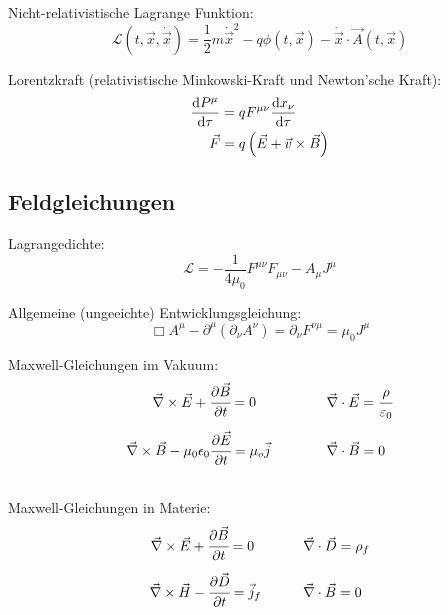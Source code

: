 \documentclass[11pt]{article}
\numberwithin{equation}{section}
\begin{document}
			\noindent
			Nicht-relativistische Lagrange Funktion:
			\begin{equation}
				\mathcal{L}(t,\vec{x},\dot{\vec{x}}) = \frac{1}{2}m\dot{\vec{x}}^2 - q\phi(t,\vec{x}) - \dot{\vec{x}}\cdot\vec{A}(t,\vec{x})
			\end{equation}

			\noindent
			Lorentzkraft (relativistische Minkowski-Kraft und Newton'sche Kraft):
			\begin{equation}
				\begin{aligned}
					\frac{\mathrm{d} P^\mu}{\mathrm{d} \tau} &= q F^{\mu\nu}\frac{\mathrm{d} x_\nu}{\mathrm{d} \tau} \\
					\vec{F} &= q\left(\vec{E}+\vec{v}\times\vec{B}\right) \\
				\end{aligned}
			\end{equation}

		\subsection{Feldgleichungen}
			\noindent
			Lagrangedichte:
			\begin{equation}
				\mathcal{L} = -\frac{1}{4\mu_0}F^{\mu\nu} F_{\mu\nu} - A_\mu J^\mu
			\end{equation}

			\noindent
			Allgemeine (ungeeichte) Entwicklungsgleichung:
			\begin{equation}
				\Box A^\mu-\partial^\mu\left(\partial_\nu A^\nu\right) = \partial_\nu F^{\nu\mu} =  \mu_0 J^\mu
			\end{equation}

			\noindent
			Maxwell-Gleichungen im Vakuum:
			\begin{equation}
			\begin{array}{rl}
				\vec{\nabla}\times \vec{E} + \cfrac{\partial\vec{B}}{\partial t} = 0 \phantom{\mu_0}
				&\hspace{30pt} \vec{\nabla}\cdot\vec{E} = \cfrac{\rho}{\varepsilon_0} \\ \xrowht{40pt}
				\vec{\nabla}\times\vec{B} - \mu_0 \epsilon_0 \cfrac{\partial \vec{E}}{\partial t} = \mu_o\vec{j}
				&\hspace{30pt} \vec{\nabla}\cdot\vec{B} = 0 \\
			\end{array}
			\end{equation}

			\noindent
			Maxwell-Gleichungen in Materie:
			\begin{equation}
			\begin{array}{rl}
				\vec{\nabla}\times \vec{E} + \cfrac{\partial\vec{B}}{\partial t} = 0 \phantom{_f}
				&\hspace{20pt} \vec{\nabla}\cdot\vec{D} = \rho_f\\ \xrowht{40pt}
				\vec{\nabla}\times\vec{H} - \cfrac{\partial \vec{D}}{\partial t} = \vec{j}_f
				&\hspace{20pt} \vec{\nabla}\cdot\vec{B} = 0 \\
			\end{array}
			\end{equation}
\end{document}
